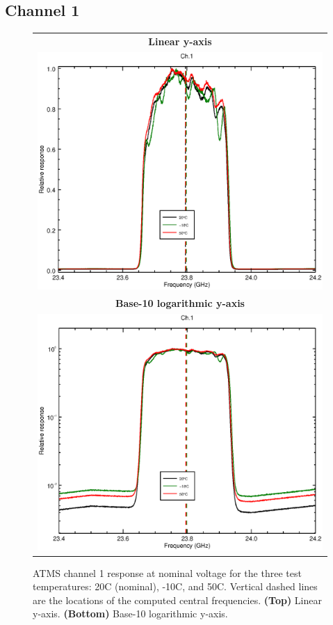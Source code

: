 \subsection{Channel 1}
\begin{figure}[H]
  \label{fig:Tset.ch1_response}
  \centering
  \begin{tabular}{c}
    \hspace{1.75cm}\sffamily\textbf{Linear y-axis} \\
    \includegraphics[scale=0.55]{graphics/srf/Tset/lin/atms_npp-1.eps} \\
    \hspace{1.75cm}\sffamily\textbf{Base-10 logarithmic y-axis} \\
    \includegraphics[scale=0.55]{graphics/srf/Tset/log/atms_npp-1.eps}
  \end{tabular}
  \caption{ATMS channel 1 response at nominal voltage for the three test temperatures: 20\textdegree{}C (nominal), -10\textdegree{}C, and 50\textdegree{}C. Vertical dashed lines are the locations of the computed central frequencies. \textbf{(Top)} Linear y-axis. \textbf{(Bottom)} Base-10 logarithmic y-axis.}
\end{figure}

